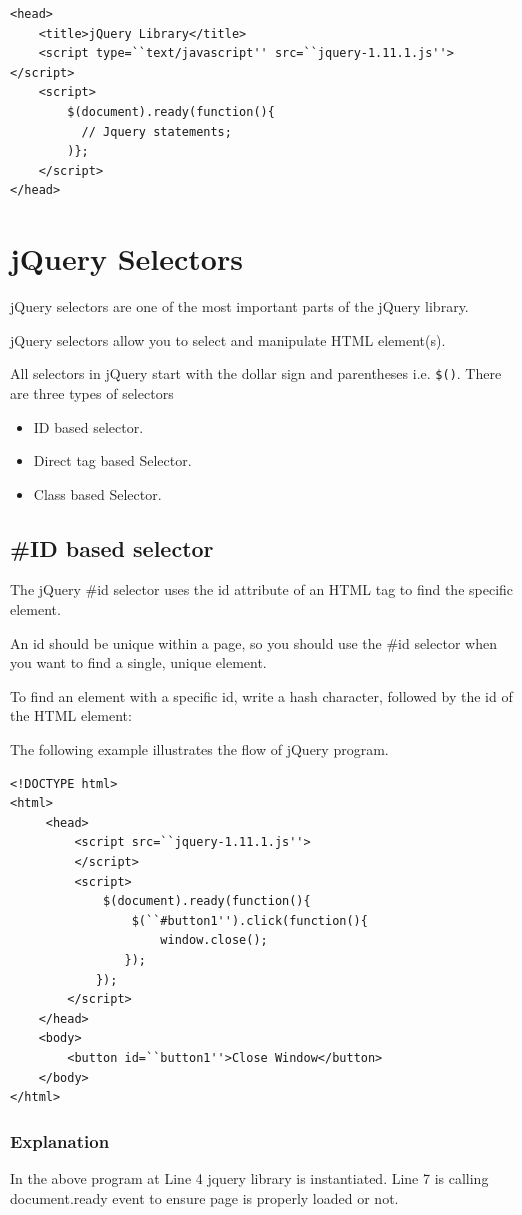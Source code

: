\documentclass[11pt,a4paper]{article}
\begin{document}
\begin{lstlisting}
<head>
    <title>jQuery Library</title>
    <script type=``text/javascript'' src=``jquery-1.11.1.js''></script>
    <script>
        $(document).ready(function(){
          // Jquery statements;
        )};
    </script>
</head>
\end{lstlisting}
\section*{jQuery Selectors}
jQuery selectors are one of the most important parts of the jQuery library.

jQuery selectors allow you to select and manipulate HTML element(s).

All selectors in jQuery start with the dollar sign and parentheses i.e. \texttt{\$()}.
There are three types of selectors
\begin{itemize}
 \item ID based selector.
 \item Direct tag based Selector.
 \item Class based Selector.
\end{itemize}
\subsection*{\#ID based selector}
The jQuery \#id selector uses the id attribute of an HTML tag to find the specific element.

An id should be unique within a page, so you should use the \#id selector when you want to find a single, unique element.

To find an element with a specific id, write a hash character, followed by the id of the HTML element:

The following example illustrates the flow of jQuery program.

\begin{lstlisting}
<!DOCTYPE html>
<html>
     <head>
         <script src=``jquery-1.11.1.js''>
         </script>
         <script>
             $(document).ready(function(){
                 $(``#button1'').click(function(){
                     window.close();
                });
            });
        </script>
    </head>
    <body>
        <button id=``button1''>Close Window</button>
    </body>
</html>
\end{lstlisting}
\subsubsection*{Explanation}
In the above program at Line 4 jquery library is instantiated. Line 7 is calling document.ready event to ensure page is properly loaded or not.
\end{document}
